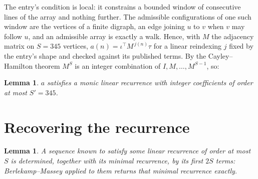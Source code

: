 \documentclass[11pt,a4paper]{article}
\theoremstyle{plain}
\newtheorem{lemma}[theorem]{Lemma}
\theoremstyle{definition}
\begin{document}
The entry's condition is local: it constrains a bounded window of consecutive lines of the
array and nothing further. The admissible configurations of one such window are the vertices
of a finite digraph, an edge joining $u$ to $v$ when $v$ may follow $u$, and an admissible
array is exactly a walk. Hence, with $M$ the adjacency matrix on $S=345$ vertices,
$a(n)=\iota^{\!\top}M^{\,j(n)}\tau$ for a linear reindexing $j$ fixed by the entry's shape
and checked against its published terms. By the Cayley--Hamilton theorem $M^{S}$ is an
integer combination of $I,M,\dots,M^{S-1}$, so:

\begin{lemma}\label{lem:cf}
$a$ satisfies a monic linear recurrence with integer coefficients of order at most
$S'=345$.
\end{lemma}

\section{Recovering the recurrence}

\begin{lemma}\label{lem:bm}
A sequence known to satisfy some linear recurrence of order at most $S$ is determined, together
with its minimal recurrence, by its first $2S$ terms: Berlekamp--Massey applied to them returns
that minimal recurrence exactly.
\end{lemma}
\end{document}
